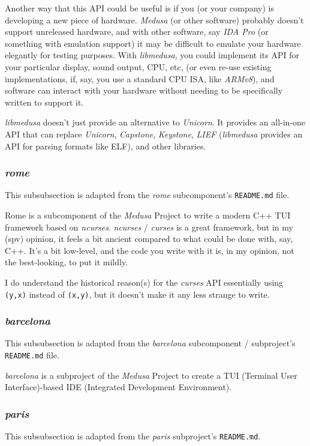 \documentclass{article}
\begin{document}
	Another way that this API could be useful is if you (or your company) is
	developing a new piece of hardware. \textit{Medusa} (or other software)
	probably doesn't support unreleased hardware, and with other software, say
	\textit{IDA Pro} (or something with emulation support) it may be difficult
	to emulate your hardware elegantly for testing purposes. With
	\textit{libmedusa}, you could implement its API for your particular display,
	sound output, CPU, etc, (or even re-use existing implementations, if, say,
	you use a standard CPU ISA, like \textit{ARMv8}), and software can interact
	with your hardware without needing to be specifically written to support it.

	\textit{libmedusa} doesn't just provide an alternative to \textit{Unicorn}.
	It provides an all-in-one API that can replace \textit{Unicorn},
	\textit{Capstone}, \textit{Keystone}, \textit{LIEF} (\textit{libmedusa}
	provides an API for parsing formats like ELF), and other libraries.

	\subsubsection{\textit{rome}}
	This subsubsection is adapted from the \textit{rome} subcomponent's
	\texttt{README.md} file.

	Rome is a subcomponent of the \textit{Medusa} Project to write a modern C++
	TUI framework based on \textit{ncurses}. \textit{ncurses} / \textit{curses}
	is a great framework, but in my (spv) opinion, it feels a bit ancient
	compared to what could be done with, say, C++. It's a bit low-level, and the
	code you write with it is, in my opinion, not the best-looking, to put it
	mildly.

	I do understand the historical reason(s) for the \textit{curses} API
	essentially using \texttt{(y,x)} instead of \texttt{(x,y)}, but it doesn't
	make it any less strange to write.

	\subsubsection{\textit{barcelona}}
	This subsubsection is adapted from the \textit{barcelona} subcomponent /
	subproject's \texttt{README.md} file.

	\textit{barcelona} is a subproject of the \textit{Medusa} Project to create
	a TUI (Terminal User Interface)-based IDE (Integrated Development
	Environment).

	\subsubsection{\textit{paris}}
	This subsubsection is adapted from the \textit{paris} subproject's
	\texttt{README.md}.
\end{document}
